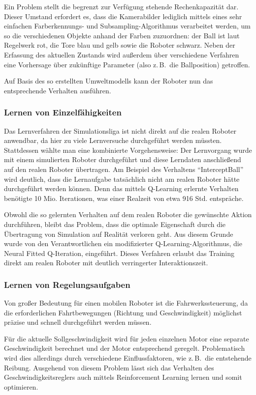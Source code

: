 Ein Problem stellt die begrenzt zur Verfügung stehende Rechenkapazität dar. 
Dieser Umstand erfordert es, dass die Kamerabilder lediglich mittels eines sehr 
einfachen Farberkennungs- und Subsampling-Algorithmus verarbeitet werden, um so 
die verschiedenen Objekte anhand der Farben zuzuordnen: der Ball ist laut 
Regelwerk rot, die Tore blau und gelb sowie die Roboter schwarz. Neben der 
Erfassung des aktuellen Zustands wird außerdem über verschiedene Verfahren eine 
Vorhersage über zukünftige Parameter (also z.\,B.\ die Ballposition) getroffen.

Auf Basis des so erstellten Umweltmodells kann der Roboter nun das 
entsprechende Verhalten ausführen.

\subsubsection{Lernen von Einzelfähigkeiten}
Das Lernverfahren der Simulationsliga ist nicht direkt auf die realen Roboter 
anwendbar, da hier zu viele Lernversuche durchgeführt werden müssten. 
Stattdessen wählte man eine kombinierte Vorgehensweise: Der Lernvorgang wurde 
mit einem simulierten Roboter durchgeführt und diese Lerndaten anschließend auf 
den realen Roboter übertragen.
Am Beispiel des Verhaltens "`InterceptBall"' wird deutlich, dass die Lernaufgabe
tatsächlich nicht am realen Roboter hätte durchgeführt werden können. Denn das
mittels Q-Learning erlernte Verhalten benötigte 10 Mio. Iterationen, was einer
Realzeit von etwa 916 Std. entspräche.

Obwohl die so gelernten Verhalten auf dem realen Roboter die gewünschte Aktion
durchführen, bleibt das Problem, dass die optimale Eigenschaft durch die
Übertragung von Simulation auf Realität verloren geht. Aus diesem Grunde wurde
von den Verantwortlichen ein modifizierter Q-Learning-Algorithmus, die Neural
Fitted Q-Iteration, eingeführt. Dieses Verfahren erlaubt das Training direkt am
realen Roboter mit deutlich verringerter Interaktionszeit.

\subsubsection{Lernen von Regelungsaufgaben}
Von großer Bedeutung für einen mobilen Roboter ist die Fahrwerkssteuerung, da 
die erforderlichen Fahrtbewegungen (Richtung und Geschwindigkeit) möglichst 
präzise und schnell durchgeführt werden müssen.

Für die aktuelle Sollgeschwindigkeit wird für jeden einzelnen Motor eine 
separate Geschwindigkeit berechnet und der Motor entsprechend geregelt. 
Problematisch wird dies allerdings durch verschiedene Einflussfaktoren, wie 
z.\,B.\ die entstehende Reibung. Ausgehend von diesem Problem lässt sich das 
Verhalten des Geschwindigkeitsreglers auch mittels Reinforcement Learning 
lernen und somit optimieren.

